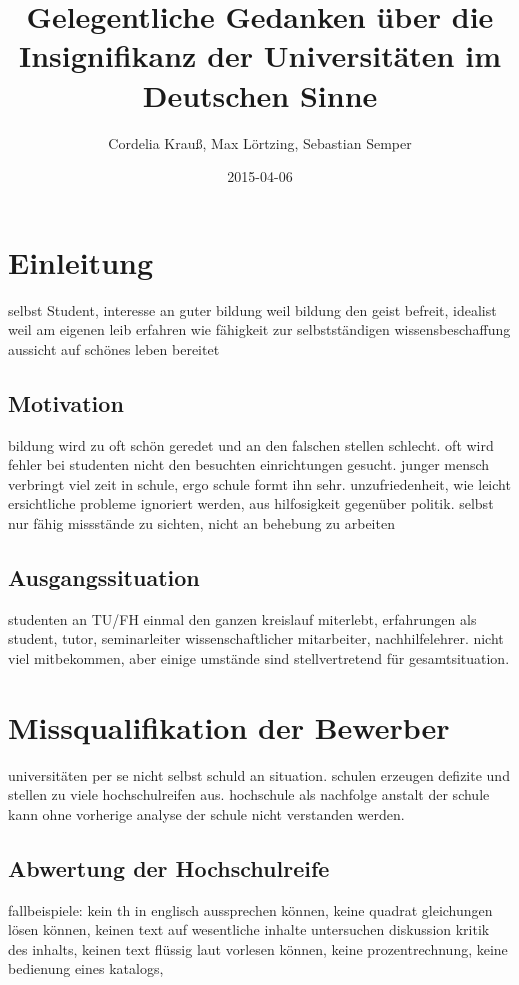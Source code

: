 \documentclass[a4paper,10pt,twoside,titlepage]{article}
\author{Cordelia Krauß, Max Lörtzing, Sebastian Semper}
\title{Gelegentliche Gedanken über die Insignifikanz der Universitäten im Deutschen Sinne}
\date{2015-04-06}
\begin{document}
\maketitle

\tableofcontents

\newpage


\section{Einleitung}
selbst Student, interesse an guter bildung weil bildung den geist befreit, idealist weil am eigenen leib erfahren wie fähigkeit zur selbstständigen wissensbeschaffung aussicht auf schönes leben bereitet

\subsection{Motivation}
bildung wird zu oft schön geredet und an den falschen stellen schlecht. oft wird fehler bei studenten nicht den besuchten einrichtungen gesucht. junger mensch verbringt viel zeit in schule, ergo schule formt ihn sehr. unzufriedenheit, wie leicht ersichtliche probleme ignoriert werden, aus hilfosigkeit gegenüber politik. selbst nur fähig missstände zu sichten, nicht an behebung zu arbeiten

\subsection{Ausgangssituation}
studenten an TU/FH einmal den ganzen kreislauf miterlebt, erfahrungen als student, tutor, seminarleiter wissenschaftlicher mitarbeiter, nachhilfelehrer. nicht viel mitbekommen, aber einige umstände sind stellvertretend für gesamtsituation.

\section{Missqualifikation der Bewerber}
universitäten per se nicht selbst schuld an situation. schulen erzeugen defizite und stellen zu viele hochschulreifen aus. hochschule als nachfolge anstalt der schule kann ohne vorherige analyse der schule nicht verstanden werden.

\subsection{Abwertung der Hochschulreife}
fallbeispiele: kein th in englisch aussprechen können, keine quadrat gleichungen lösen können, keinen text auf wesentliche inhalte untersuchen diskussion kritik des inhalts, keinen text flüssig laut vorlesen können, keine prozentrechnung, keine bedienung eines katalogs,
\end{document}
